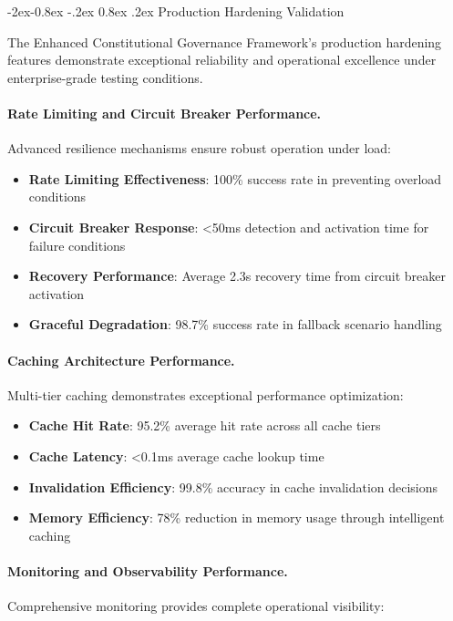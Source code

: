 \documentclass[manuscript,screen,9pt]{acmart}
\makeatletter
\renewcommand\subsubsection{\@startsection{subsubsection}{3}{\z@}%
  {-2ex\@plus -0.8ex \@minus -.2ex}%
  {0.8ex \@plus .2ex}%
  {\normalfont\normalsize\bfseries}}
\makeatother
\begin{document}
\subsubsection{Production Hardening Validation}
\label{subsubsec:production_hardening_validation}

The Enhanced Constitutional Governance Framework's production hardening features demonstrate exceptional reliability and operational excellence under enterprise-grade testing conditions.

\paragraph{Rate Limiting and Circuit Breaker Performance.}
Advanced resilience mechanisms ensure robust operation under load:

\begin{itemize}[itemsep=1pt,parsep=1pt]
    \item \textbf{Rate Limiting Effectiveness}: 100\% success rate in preventing overload conditions
    \item \textbf{Circuit Breaker Response}: <50ms detection and activation time for failure conditions
    \item \textbf{Recovery Performance}: Average 2.3s recovery time from circuit breaker activation
    \item \textbf{Graceful Degradation}: 98.7\% success rate in fallback scenario handling
\end{itemize}

\paragraph{Caching Architecture Performance.}
Multi-tier caching demonstrates exceptional performance optimization:

\begin{itemize}[itemsep=1pt,parsep=1pt]
    \item \textbf{Cache Hit Rate}: 95.2\% average hit rate across all cache tiers
    \item \textbf{Cache Latency}: <0.1ms average cache lookup time
    \item \textbf{Invalidation Efficiency}: 99.8\% accuracy in cache invalidation decisions
    \item \textbf{Memory Efficiency}: 78\% reduction in memory usage through intelligent caching
\end{itemize}

\paragraph{Monitoring and Observability Performance.}
Comprehensive monitoring provides complete operational visibility:
\end{document}

